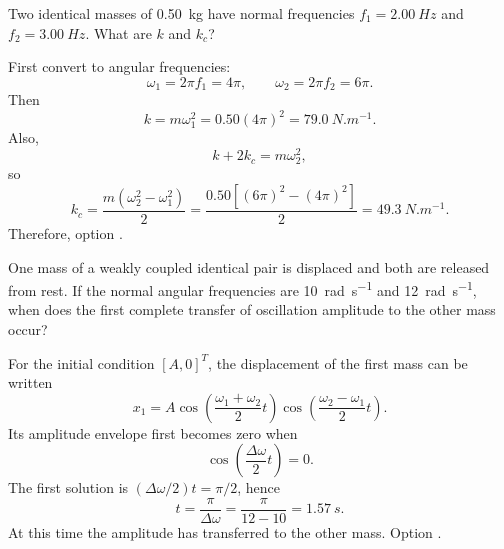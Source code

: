 \begin{quizquestion}[
  id=phy104-nm-047,
  topic=normal-modes,
  difficulty=challenge,
  marks=3,
  correct=B,
  tags={coupled-oscillators,measured-frequencies,spring-constants},
  outcome={Recover coupled-system spring constants from frequencies}
]
  Two identical masses of \SI{0.50}{kg} have normal frequencies \(f_1=\SI{2.00}{Hz}\) and \(f_2=\SI{3.00}{Hz}\). What are \(k\) and \(k_c\)?
\end{quizquestion}
\begin{quizsolution}
  First convert to angular frequencies:
    \[
      \omega_1=2\pi f_1=4\pi,
      \qquad
      \omega_2=2\pi f_2=6\pi.
    \]
    Then
    \[
      k=m\omega_1^2=0.50{(4\pi)}^2=\SI{79.0}{N.m^{-1}}.
    \]
    Also,
    \[
      k+2k_c=m\omega_2^2,
    \]
    so
    \[
      k_c=\frac{m(\omega_2^2-\omega_1^2)}{2}
      =\frac{0.50[{(6\pi)}^2-{(4\pi)}^2]}{2}
      =\SI{49.3}{N.m^{-1}}.
    \]
    Therefore, option \textbf{\quizcorrectletter}.
\end{quizsolution}

\begin{quizquestion}[
  id=phy104-nm-048,
  topic=normal-modes,
  difficulty=challenge,
  marks=3,
  correct=D,
  tags={beats,coupled-oscillators,energy-transfer},
  outcome={Determine the first complete energy-transfer time}
]
  One mass of a weakly coupled identical pair is displaced and both are released from rest. If the normal angular frequencies are \SI{10}{rad.s^{-1}} and \SI{12}{rad.s^{-1}}, when does the first complete transfer of oscillation amplitude to the other mass occur?
\end{quizquestion}
\begin{quizsolution}
  For the initial condition \({[A,0]}^T\), the displacement of the first mass can be written
    \[
      x_1=A\cos\left(\frac{\omega_1+\omega_2}{2}t\right)
      \cos\left(\frac{\omega_2-\omega_1}{2}t\right).
    \]
    Its amplitude envelope first becomes zero when
    \[
      \cos\left(\frac{\Delta\omega}{2}t\right)=0.
    \]
    The first solution is \((\Delta\omega/2)t=\pi/2\), hence
    \[
      t=\frac{\pi}{\Delta\omega}=\frac{\pi}{12-10}=\SI{1.57}{s}.
    \]
    At this time the amplitude has transferred to the other mass. Option \textbf{\quizcorrectletter}.
\end{quizsolution}

